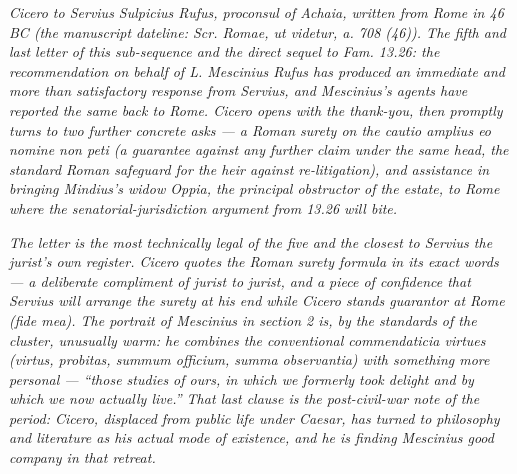 
\textit{Cicero to Servius Sulpicius Rufus, proconsul of
Achaia, written from Rome in 46 BC (the manuscript
dateline: \textit{Scr. Romae, ut videtur, a. 708 (46)}).
The fifth and last letter of this sub-sequence and the
direct sequel to Fam. 13.26: the recommendation on
behalf of L. Mescinius Rufus has produced an immediate
and more than satisfactory response from Servius, and
Mescinius's agents have reported the same back to Rome.
Cicero opens with the thank-you, then promptly turns
to two further concrete asks --- a Roman surety on the
\textit{cautio amplius eo nomine non peti} (a guarantee
against any further claim under the same head, the
standard Roman safeguard for the heir against
re-litigation), and assistance in bringing Mindius's
widow Oppia, the principal obstructor of the estate, to
Rome where the senatorial-jurisdiction argument from
13.26 will bite.}

\textit{The letter is the most technically legal of the
five and the closest to Servius the jurist's own
register. Cicero quotes the Roman surety formula in its
exact words --- a deliberate compliment of jurist to
jurist, and a piece of confidence that Servius will
arrange the surety at his end while Cicero stands
guarantor at Rome (\textit{fide mea}). The portrait of
Mescinius in section 2 is, by the standards of the
cluster, unusually warm: he combines the conventional
\textit{commendaticia} virtues (\textit{virtus,
probitas, summum officium, summa observantia}) with
something more personal --- ``those studies of ours, in
which we formerly took delight and by which we now
actually live.'' That last clause is the post-civil-war
note of the period: Cicero, displaced from public
life under Caesar, has turned to philosophy and
literature as his actual mode of existence, and he is
finding Mescinius good company in that retreat.}
